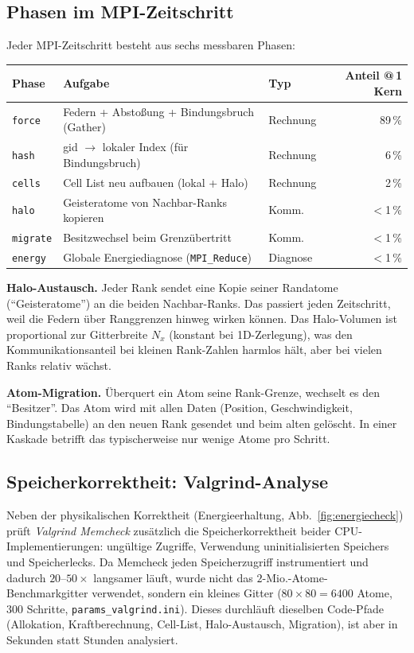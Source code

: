 \documentclass[11pt,a4paper]{article}
\begin{document}
\subsection{Phasen im MPI-Zeitschritt}

Jeder MPI-Zeitschritt besteht aus sechs messbaren Phasen:

\begin{center}\small
\begin{tabular}{@{}lllr@{}}
\toprule
Phase & Aufgabe & Typ & Anteil @\,1 Kern \\
\midrule
\texttt{force}   & Federn + Abstoßung + Bindungsbruch (Gather)   & Rechnung   & 89\,\% \\
\texttt{hash}    & gid $\to$ lokaler Index (für Bindungsbruch)    & Rechnung   &  6\,\% \\
\texttt{cells}   & Cell List neu aufbauen (lokal + Halo)          & Rechnung   &  2\,\% \\
\texttt{halo}    & Geisteratome von Nachbar-Ranks kopieren        & Komm.      & $<$1\,\% \\
\texttt{migrate} & Besitzwechsel beim Grenzübertritt              & Komm.      & $<$1\,\% \\
\texttt{energy}  & Globale Energiediagnose (\texttt{MPI\_Reduce}) & Diagnose   & $<$1\,\% \\
\bottomrule
\end{tabular}
\end{center}

\textbf{Halo-Austausch.}
Jeder Rank sendet eine Kopie seiner Randatome (``Geisteratome'') an die
beiden Nachbar-Ranks. Das passiert jeden Zeitschritt, weil die Federn
über Ranggrenzen hinweg wirken können. Das Halo-Volumen ist proportional
zur Gitterbreite $N_x$ (konstant bei 1D-Zerlegung), was den Kommunikationsanteil
bei kleinen Rank-Zahlen harmlos hält, aber bei vielen Ranks relativ wächst.

\textbf{Atom-Migration.}
Überquert ein Atom seine Rank-Grenze, wechselt es den ``Besitzer''. Das
Atom wird mit allen Daten (Position, Geschwindigkeit, Bindungstabelle)
an den neuen Rank gesendet und beim alten gelöscht. In einer Kaskade
betrifft das typischerweise nur wenige Atome pro Schritt.

\subsection{Speicherkorrektheit: Valgrind-Analyse}
\label{sec:valgrind}

Neben der physikalischen Korrektheit (Energieerhaltung, Abb.~\ref{fig:energiecheck})
prüft \emph{Valgrind Memcheck} zusätzlich die Speicherkorrektheit beider
CPU-Implementierungen: ungültige Zugriffe, Verwendung uninitialisierten
Speichers und Speicherlecks. Da Memcheck jeden Speicherzugriff
instrumentiert und dadurch $20$--$50\times$ langsamer läuft, wurde nicht das
$2$-Mio.-Atome-Benchmarkgitter verwendet, sondern ein kleines Gitter
($80\times80 = 6400$ Atome, $300$ Schritte, \texttt{params\_valgrind.ini}).
Dieses durchläuft dieselben Code-Pfade (Allokation, Kraftberechnung, Cell-List,
Halo-Austausch, Migration), ist aber in Sekunden statt Stunden analysiert.
\end{document}
